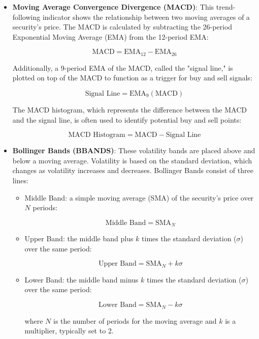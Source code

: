 \begin{itemize}
	\item \textbf{Moving Average Convergence Divergence (MACD)}: This trend-following indicator shows the relationship between two moving averages of a security's price. The MACD is calculated by subtracting the 26-period Exponential Moving Average (EMA) from the 12-period EMA:

	      \[
		      \text{MACD} = \text{EMA}_{12} - \text{EMA}_{26}
	      \]

	      Additionally, a 9-period EMA of the MACD, called the "signal line," is plotted on top of the MACD to function as a trigger for buy and sell signals:

	      \[
		      \text{Signal Line} = \text{EMA}_{9}(\text{MACD})
	      \]

	      The MACD histogram, which represents the difference between the MACD and the signal line, is often used to identify potential buy and sell points:

	      \[
		      \text{MACD Histogram} = \text{MACD} - \text{Signal Line}
	      \]

	\item \textbf{Bollinger Bands (BBANDS)}: These volatility bands are placed above and below a moving average. Volatility is based on the standard deviation, which changes as volatility increases and decreases. Bollinger Bands consist of three lines:

	      \begin{itemize}
		      \item Middle Band: a simple moving average (SMA) of the security's price over \( N \) periods:

		            \[
			            \text{Middle Band} = \text{SMA}_{N}
		            \]

		      \item Upper Band: the middle band plus \( k \) times the standard deviation (\( \sigma \)) over the same period:

		            \[
			            \text{Upper Band} = \text{SMA}_{N} + k\sigma
		            \]

		      \item Lower Band: the middle band minus \( k \) times the standard deviation (\( \sigma \)) over the same period:

		            \[
			            \text{Lower Band} = \text{SMA}_{N} - k\sigma
		            \]

		            where \( N \) is the number of periods for the moving average and \( k \) is a multiplier, typically set to 2.
	      \end{itemize}

\end{itemize}

